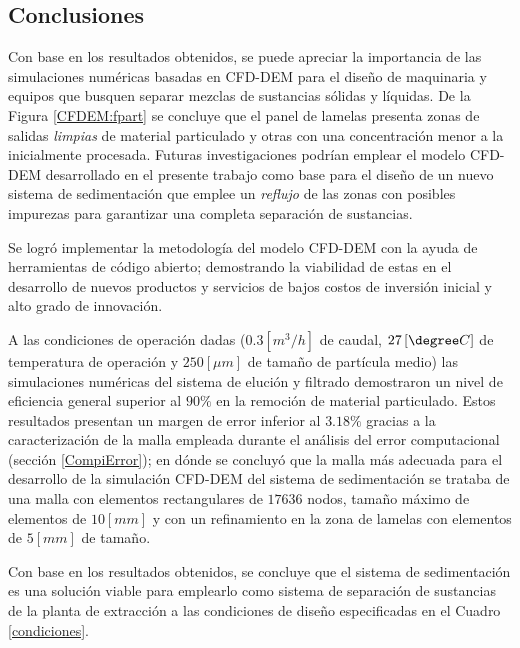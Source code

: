 \begin{center}
	\section{Conclusiones}
\end{center}

\noindent
\justify

Con base en los resultados obtenidos, se puede apreciar la importancia de las simulaciones num\'ericas basadas en CFD-DEM para el dise\~no de maquinaria y equipos que busquen separar mezclas de sustancias s\'olidas y l\'iquidas. De la Figura \ref{CFDEM:fpart} se concluye que el panel de lamelas presenta zonas de salidas \textit{limpias} de material particulado y otras con una concentraci\'on menor a la inicialmente procesada. Futuras investigaciones podr\'ian emplear el modelo CFD-DEM desarrollado en el presente trabajo como base para el dise\~no de un nuevo sistema de sedimentaci\'on que emplee un \textit{reflujo} de las zonas con posibles impurezas para garantizar una completa separaci\'on de sustancias.

\noindent
\justify

Se logr\'o implementar la metodolog\'ia del modelo CFD-DEM con la ayuda de herramientas de c\'odigo abierto; demostrando la viabilidad de estas en el desarrollo de nuevos productos y servicios de bajos costos de inversi\'on inicial y alto grado de innovaci\'on.

\noindent
\justify

A las condiciones de operaci\'on dadas ($0.3 \left[ m^3/h \right]$ de caudal, $27 \left[ \degree C \right]$ de temperatura de operaci\'on y $250 [ \mu m]$ de tama\~no de part\'icula medio) las simulaciones num\'ericas del sistema de eluci\'on y filtrado demostraron un nivel de eficiencia general superior al $90 \%$ en la remoci\'on de material particulado. Estos resultados presentan un margen de error inferior al $3.18 \%$ gracias a la caracterizaci\'on de la malla empleada durante el an\'alisis del error computacional (secci\'on \ref{CompiError}); en d\'onde se concluy\'o que la malla m\'as adecuada para el desarrollo de la simulaci\'on CFD-DEM del sistema de sedimentaci\'on se trataba de una malla con elementos rectangulares de $17636$ nodos, tama\~no m\'aximo de elementos de $10 [mm]$ y con un refinamiento en la zona de lamelas con elementos de $5 [mm]$ de tama\~no.

\noindent
\justify

Con base en los resultados obtenidos, se concluye que el sistema de sedimentaci\'on es una soluci\'on viable para emplearlo como sistema de separaci\'on de sustancias de la planta de extracci\'on a las condiciones de dise\~no especificadas en el Cuadro \ref{condiciones}.

